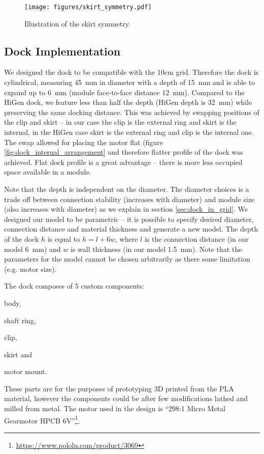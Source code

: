 \begin{figure}[h!]
    \centering
    \texttt{[image: figures/skirt\_symmetry.pdf]}
    \caption{Illustration of the skirt symmetry.}
    \label{fig:dock_skirt_symmetry}
\end{figure}

\subsection{Dock Implementation}

We designed the dock to be compatible with the 10cm grid. Therefore the dock is
cylindrical, measuring 45~mm in diameter with a depth of 15~mm and is able to
expand up to 6~mm (module face-to-face distance 12~mm). Compared to the HiGen
dock, we feature less than half the depth (HiGen depth is 32~mm) while
preserving the same docking distance. This was achieved by swapping positions of
the clip and skirt -- in our case the clip is the external ring and skirt is the
internal, in the HiGen case skirt is the external ring and clip is the internal
one. The swap allowed for placing the motor flat (figure
\ref{fig:dock_internal_arrangement} and therefore flatter profile of the dock
was achieved. Flat dock profile is a great advantage -- there is more less
occupied space available in a module.

Note that the depth is independent on the diameter. The diameter choices is a
trade off between connection stability (increases with diameter) and module size
(also increases with diameter) as we explain in section \ref{sec:dock_in_grid}.
We designed our model to be parametric -- it is possible to specify desired
diameter, connection distance and material thickness and generate a new model.
The depth of the dock $h$ is equal to $h=l+6w$, where $l$ is the connection
distance (in our model 6~mm) and $w$ is wall thickness (in our model 1.5~mm).
Note that the parameters for the model cannot be chosen arbitrarily as there
some limitation (e.g. motor size).

The dock composes of 5 custom components:
\begin{enumerate*}
    \item body,
    \item shaft ring,
    \item clip,
    \item skirt and
    \item motor mount.
\end{enumerate*}
These parts are for the purposes of prototyping 3D printed from the PLA
material, however the components could be after few modifications lathed and
milled from metal. The motor used in the design is ``298:1 Micro Metal Gearmotor
HPCB 6V''\footnote{\url{https://www.pololu.com/product/3069}}.

